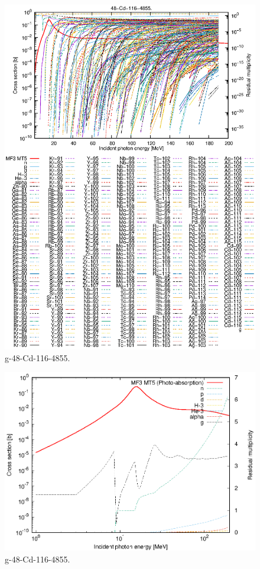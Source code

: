 \begin{figure}
 \includegraphics[width=\linewidth]{eps/g_48-Cd-116_4855.eps}
  \caption{g-48-Cd-116-4855.}
\end{figure}
\newpage \clearpage

\begin{figure}
 \includegraphics[width=\linewidth]{eps-log/g_48-Cd-116_4855.eps}
 \caption{g-48-Cd-116-4855.}
\end{figure}
\newpage \clearpage

